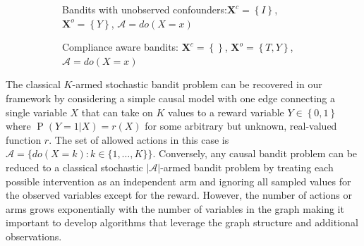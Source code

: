 \documentclass[11pt,a4paper,twoside]{report}
\newcommand{\actionspace}{\mathcal{A}}
\newcommand{\set}[1]{\left\{#1\right\}}
\renewcommand{\P}[1]{\operatorname{P}\left(#1\right)}
\renewcommand{\vec}[1]{\boldsymbol{#1}}
\theoremstyle{plain}
\theoremstyle{definition}
\begin{document}
\begin{figure}[ht]
\centering
\begin{subfigure}[t]{0.49\textwidth}
\centering
\caption{Bandits with unobserved confounders:$\vec{X}^c=\set{I}$, $\vec{X}^o = \set{Y}$, $\actionspace = do(X=x)$}
\label{fig:confounded-causal-bandit-graph}
\end{subfigure}
\begin{subfigure}[t]{0.49\textwidth}
\centering
\caption{Compliance aware bandits: $\vec{X}^c=\set{}$, $\vec{X}^o = \set{T,Y}$, $\actionspace = do(X=x)$ }
\label{fig:imperfect-compliance-causal-bandit-graph}
\end{subfigure}
\caption{}
\label{fig:causal-bandit-version-confounded-compliance}
\end{figure}

The classical $K$-armed stochastic bandit problem can be recovered in our framework by considering a simple causal model with one edge connecting a single variable $X$ that can take on $K$ values to a reward variable $Y \in \set{0,1}$ where $\P{Y = 1|X} = r(X)$ for some arbitrary but unknown, real-valued function $r$. The set of allowed actions in this case is $\mathcal{A} = \{ do(X = k) \colon k \in \{1, \ldots, K\}\}$. Conversely, any causal bandit problem can be reduced to a classical stochastic $|\mathcal{A}|$-armed bandit problem by treating each possible intervention as an independent arm and ignoring all sampled values for the observed variables except for the reward. However, the number of actions or arms grows exponentially with the number of variables in the graph making it important to develop algorithms that leverage the graph structure and additional observations.
\end{document}
